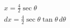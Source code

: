 \documentclass[preview]{standalone}
\begin{document}
\begin{align*}
x=\frac{4}{2}\sec\theta \\ dx=\frac{4}{2}\sec\theta\tan\theta \, d\theta
\end{align*}
\end{document}
